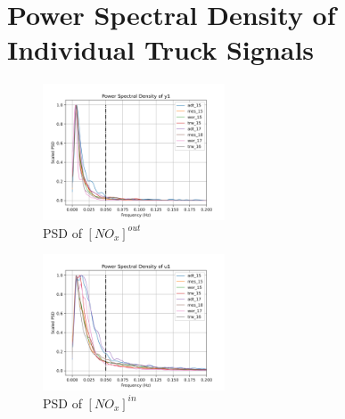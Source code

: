 \section{Power Spectral Density of Individual Truck Signals}

\begin{multicols}{2}
       \begin{figure}[H]
        \centering
        \includegraphics[width=0.48\textwidth]{./figs/bfr_smth/truck_psd/y1.png}
        \caption{PSD of $[NO_x]^{out}$}
       \end{figure}

       \begin{figure}[H]
        \centering
        \includegraphics[width=0.48\textwidth]{./figs/bfr_smth/truck_psd/u1.png}
        \caption{PSD of $[NO_x]^{in}$}
       \end{figure}
\end{multicols}

